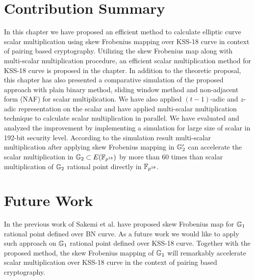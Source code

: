 \section{Contribution Summary}
In this chapter we have proposed an efficient method to calculate elliptic curve scalar multiplication using skew Frobenius mapping  over KSS-18 curve in context of pairing based cryptography. 
Utilizing the skew Frobenius map along with multi-scalar multiplication procedure, an efficient scalar multiplication method for KSS-18 curve is proposed in the chapter.
In addition to the theoretic proposal, this chapter has also presented a comparative simulation of the proposed approach with plain binary method, sliding window method and non-adjacent form (NAF) for scalar multiplication. 
We have also applied $(t-1)$-adic and $z$-adic representation on the scalar and have applied multi-scalar multiplication technique to  calculate scalar multiplication in parallel. 
We have evaluated and analyzed the improvement by implementing a simulation for large size of scalar in 192-bit security level. 
According to the simulation result multi-scalar multiplication after applying skew Frobenius mapping in ${\mathbb{G}}_{2}'$ can accelerate the scalar multiplication in ${\mathbb{G}}_{2} \subset E(\mathbb{F}_{p^{18}})$ by more than 60 times than scalar multiplication of ${\mathbb{G}}_{2}$ rational point directly in $\mathbb{F}_{p^{18}}$. 

\section{Future Work}

In the previous work of Sakemi et al. \cite{CANS:SNOKM08} have proposed skew Frobenius map for ${\mathbb{G}}_{1}$ rational point defined over BN curve. 
As a future work we would like to apply such approach on ${\mathbb{G}}_{1}$ rational point defined over KSS-18 curve.
Together with the proposed method, the skew Frobenius mapping of ${\mathbb{G}}_{1}$ will remarkably accelerate scalar multiplication over KSS-18 curve in the context of pairing based cryptography. 
